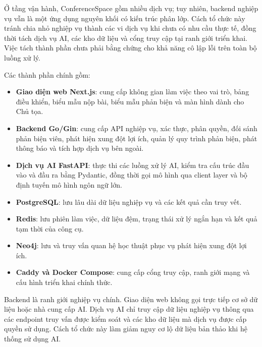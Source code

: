 Ở tầng vận hành, ConferenceSpace gồm nhiều dịch vụ; tuy nhiên, backend nghiệp vụ vẫn là một ứng dụng nguyên khối có kiến trúc phân lớp. Cách tổ chức này tránh chia nhỏ nghiệp vụ thành các vi dịch vụ khi chưa có nhu cầu thực tế, đồng thời tách dịch vụ AI, các kho dữ liệu và cổng truy cập tại ranh giới triển khai. Việc tách thành phần chưa phải bằng chứng cho khả năng cô lập lỗi trên toàn bộ luồng xử lý.

Các thành phần chính gồm:

\begin{itemize}
  \item \textbf{Giao diện web Next.js}: cung cấp không gian làm việc theo vai trò, bảng điều khiển, biểu mẫu nộp bài, biểu mẫu phản biện và màn hình dành cho Chủ tọa.
  \item \textbf{Backend Go/Gin}: cung cấp API nghiệp vụ, xác thực, phân quyền, đối sánh phản biện viên, phát hiện xung đột lợi ích, quản lý quy trình phản biện, phát thông báo và tích hợp dịch vụ bên ngoài.
  \item \textbf{Dịch vụ AI FastAPI}: thực thi các luồng xử lý AI, kiểm tra cấu trúc đầu vào và đầu ra bằng Pydantic, đồng thời gọi mô hình qua client layer và bộ định tuyến mô hình ngôn ngữ lớn.
  \item \textbf{PostgreSQL}: lưu lâu dài dữ liệu nghiệp vụ và các kết quả cần truy vết.
  \item \textbf{Redis}: lưu phiên làm việc, dữ liệu đệm, trạng thái xử lý ngắn hạn và kết quả tạm thời của công cụ.
  \item \textbf{Neo4j}: lưu và truy vấn quan hệ học thuật phục vụ phát hiện xung đột lợi ích.
  \item \textbf{Caddy và Docker Compose}: cung cấp cổng truy cập, ranh giới mạng và cấu hình triển khai chính thức.
\end{itemize}

Backend là ranh giới nghiệp vụ chính. Giao diện web không gọi trực tiếp cơ sở dữ liệu hoặc nhà cung cấp AI. Dịch vụ AI chỉ truy cập dữ liệu nghiệp vụ thông qua các endpoint truy vấn được kiểm soát và các kho dữ liệu mà dịch vụ được cấp quyền sử dụng. Cách tổ chức này làm giảm nguy cơ lộ dữ liệu bản thảo khi hệ thống sử dụng AI.

